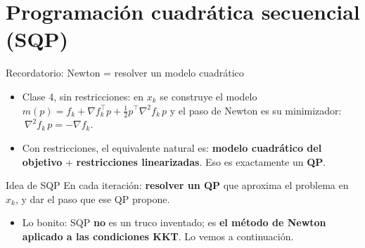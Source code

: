 \documentclass[aspectratio=169]{beamer}
\newcommand{\grad}{\nabla}
\begin{document}
\section{Programación cuadrática secuencial (SQP)}

\begin{frame}{Recordatorio: Newton = resolver un modelo cuadrático}
  \begin{itemize}
    \item Clase 4, sin restricciones: en $x_k$ se construye el modelo $m(p)=f_k+\grad f_k^\top p+\tfrac12p^\top\grad^2f_k\,p$ y el paso de Newton es su minimizador: $\ \grad^2f_k\,p=-\grad f_k$.
    \item Con restricciones, el equivalente natural es: \textbf{modelo cuadrático del objetivo} + \textbf{restricciones linearizadas}. Eso es exactamente un \textbf{QP}.
  \end{itemize}
  \begin{alertblock}{Idea de SQP}
    \centering En cada iteración: \textbf{resolver un QP} que aproxima el problema en $x_k$, y dar el paso que ese QP propone.
  \end{alertblock}
  \begin{itemize}
    \item Lo bonito: SQP \textbf{no} es un truco inventado; es \textbf{el método de Newton aplicado a las condiciones KKT}. Lo vemos a continuación.
  \end{itemize}
\end{frame}
\end{document}
